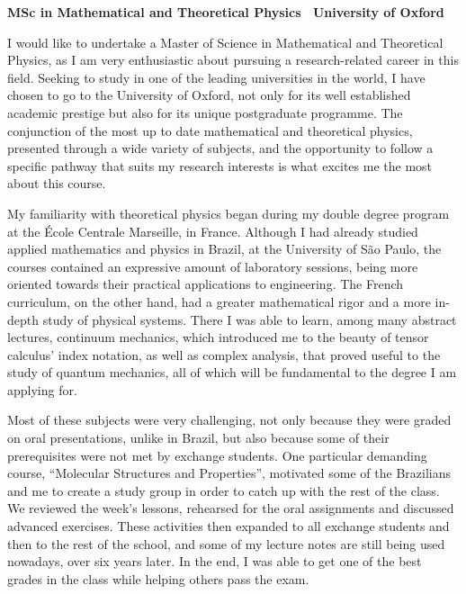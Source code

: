\documentclass[10pt]{article}
\newcommand*{\NEWLINE}{\vspace{0.75em}}
\begin{document}
\sffamily %

{\bfseries MSc in Mathematical and Theoretical Physics \textemdash~University of Oxford}
\NEWLINE{}\NEWLINE{}

I would like to undertake a Master of Science in Mathematical and Theoretical Physics, as I am very enthusiastic about pursuing a research-related career in this field. Seeking to study in one of the leading universities in the world, I have chosen to go to the University of Oxford, not only for its well established academic prestige but also for its unique postgraduate programme. The conjunction of the most up to date mathematical and theoretical physics, presented through a wide variety of subjects, and the opportunity to follow a specific pathway that suits my research interests is what excites me the most about this course. \NEWLINE{}

My familiarity with theoretical physics began during my double degree program at the École Centrale Marseille, in France. Although I had already studied applied mathematics and physics in Brazil, at the University of São Paulo, the courses contained an expressive amount of laboratory sessions, being more oriented towards their practical applications to engineering. The French curriculum, on the other hand, had a greater mathematical rigor and a more in-depth study of physical systems. There I was able to learn, among many abstract lectures, continuum mechanics, which introduced me to the beauty of tensor calculus' index notation, as well as complex analysis, that proved useful to the study of quantum mechanics, all of which will be fundamental to the degree I am applying for. \NEWLINE{}

Most of these subjects were very challenging, not only because they were graded on oral presentations, unlike in Brazil, but also because some of their prerequisites were not met by exchange students. One particular demanding course, ``Molecular Structures and Properties'', motivated some of the Brazilians and me to create a study group in order to catch up with the rest of the class. We reviewed the week's lessons, rehearsed for the oral assignments and discussed advanced exercises. These activities then expanded to all exchange students and then to the rest of the school, and some of my lecture notes are still being used nowadays, over six years later. In the end, I was able to get one of the best grades in the class while helping others pass the exam. \NEWLINE{}
\end{document}
